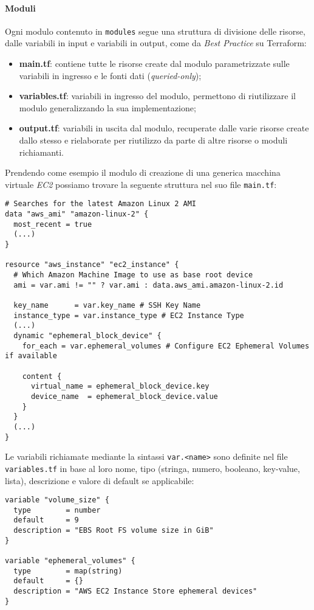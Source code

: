 \documentclass[../main.tex]{subfiles}
\begin{document}
        	    \paragraph{Moduli}
        	    Ogni modulo contenuto in \verb|modules| segue una struttura di divisione delle risorse, dalle variabili in input e variabili in output, come da \emph{Best Practice} su Terraform:
        	    \begin{itemize}
        	        \item \textbf{main.tf}: contiene tutte le risorse create dal modulo parametrizzate sulle variabili in ingresso e le fonti dati (\emph{queried-only});
        	        \item \textbf{variables.tf}: variabili in ingresso del modulo, permettono di riutilizzare il modulo generalizzando la sua implementazione;
        	        \item \textbf{output.tf}: variabili in uscita dal modulo, recuperate dalle varie risorse create dallo stesso e rielaborate per riutilizzo da parte di altre risorse o moduli richiamanti.
        	    \end{itemize}
        	    
        	    Prendendo come esempio il modulo di creazione di una generica macchina virtuale \emph{EC2} possiamo trovare la seguente struttura nel suo file \verb|main.tf|:
        	    \begin{lstlisting}
# Searches for the latest Amazon Linux 2 AMI
data "aws_ami" "amazon-linux-2" {
  most_recent = true
  (...)
}

resource "aws_instance" "ec2_instance" {
  # Which Amazon Machine Image to use as base root device
  ami = var.ami != "" ? var.ami : data.aws_ami.amazon-linux-2.id

  key_name      = var.key_name # SSH Key Name
  instance_type = var.instance_type # EC2 Instance Type
  (...)
  dynamic "ephemeral_block_device" {
    for_each = var.ephemeral_volumes # Configure EC2 Ephemeral Volumes if available

    content {
      virtual_name = ephemeral_block_device.key
      device_name  = ephemeral_block_device.value
    }
  }
  (...)
}
        	    \end{lstlisting}
        	    
        	    Le variabili richiamate mediante la sintassi \verb|var.<name>| sono definite nel file \\\verb|variables.tf| in base al loro nome, tipo (stringa, numero, booleano, key-value, lista), descrizione e valore di default se applicabile:
        	    \begin{lstlisting}
variable "volume_size" {
  type        = number
  default     = 9
  description = "EBS Root FS volume size in GiB"
}

variable "ephemeral_volumes" {
  type        = map(string)
  default     = {}
  description = "AWS EC2 Instance Store ephemeral devices"
}
        	    \end{lstlisting}
        	    
\end{document}
